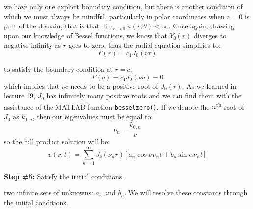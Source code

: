  we have only one explicit boundary condition, but there is another condition of which we must always be mindful, particularly in polar coordinates when $r=0$ is part of the domain; that is that $\lim_{r \to 0} u(r,\theta) < \infty$.  Once again, drawing upon our knowledge of Bessel functions, we know that $Y_0(r)$ diverges to negative infinity as $r$ goes to zero; thus the radial equation simplifies to:
\begin{equation*}
F(r) = c_1J_0(\nu r)
\end{equation*} 

 to satisfy the boundary condition at $r=c$:
\begin{equation*}
F(c) = c_1J_0(\nu c) = 0
\end{equation*}
which implies that $\nu c$ needs to be a positive root of $J_0(r)$.  As we learned in lecture 19, $J_0$ has infinitely many positive roots and we can find them with the assistance of the MATLAB function \lstinline[style=myMatlab]{besselzero()}.  If we denote the $n$\textsuperscript{th} root of $J_0$ as $k_{0,n}$, then our eigenvalues must be equal to:
\begin{equation*}
\nu_n = \frac{k_{0,n}}{c}
\end{equation*}
so the full product solution will be:
\begin{equation*}
u(r,t) = \sum\limits_{n=1}^{\infty} J_0(\nu_n r)\left[a_n \cos{\alpha \nu_n t} + b_n \sin{\alpha \nu_n t} \right]
\end{equation*}

\vspace{0.25cm}

\noindent\textbf{Step \#5:} Satisfy the initial conditions.

\vspace{0.25cm}

 two infinite sets of unknowns: $a_n$ and $b_n$.  We will resolve these constants through the initial conditions.

